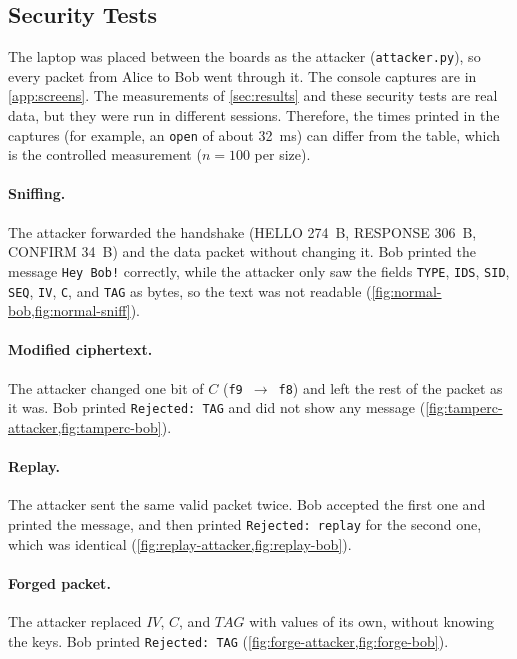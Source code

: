 \documentclass[11pt,a4paper]{article}
\begin{document}

\subsection{Security Tests}

The laptop was placed between the boards as the attacker (\texttt{attacker.py}),
so every packet from Alice to Bob went through it. The console captures are in
\cref{app:screens}. The measurements of \cref{sec:results} and these security
tests are real data, but they were run in different sessions. Therefore, the
times printed in the captures (for example, an \texttt{open} of about 32~ms)
can differ from the table, which is the controlled measurement ($n=100$ per
size).

\paragraph{Sniffing.} The attacker forwarded the handshake (HELLO 274~B,
RESPONSE 306~B, CONFIRM 34~B) and the data packet without changing it. Bob
printed the message \texttt{Hey Bob!} correctly, while the attacker only saw
the fields \texttt{TYPE}, \texttt{IDS}, \texttt{SID}, \texttt{SEQ},
\texttt{IV}, \texttt{C}, and \texttt{TAG} as bytes, so the text was not readable
(\cref{fig:normal-bob,fig:normal-sniff}).

\paragraph{Modified ciphertext.} The attacker changed one bit of $C$
(\texttt{f9}~$\rightarrow$~\texttt{f8}) and left the rest of the packet as it
was. Bob printed \texttt{Rejected: TAG} and did not show any message
(\cref{fig:tamperc-attacker,fig:tamperc-bob}).

\paragraph{Replay.} The attacker sent the same valid packet twice. Bob accepted
the first one and printed the message, and then printed
\texttt{Rejected: replay} for the second one, which was identical
(\cref{fig:replay-attacker,fig:replay-bob}).

\paragraph{Forged packet.} The attacker replaced $\mathit{IV}$, $C$, and
$\mathit{TAG}$ with values of its own, without knowing the keys. Bob printed
\texttt{Rejected: TAG} (\cref{fig:forge-attacker,fig:forge-bob}).
\end{document}
